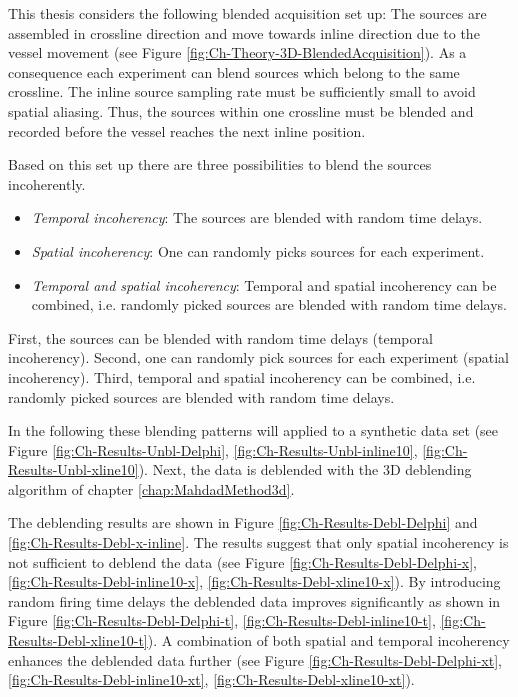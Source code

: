 This thesis considers the following blended acquisition set up: The sources are assembled in crossline direction and move towards inline direction due to the vessel movement (see Figure \ref{fig:Ch-Theory-3D-BlendedAcquisition}). As a consequence each experiment can blend sources which belong to the same crossline. The inline source sampling rate must be sufficiently small to avoid spatial aliasing. Thus, the sources within one crossline must be blended and recorded before the vessel reaches the next inline position.

Based on this set up there are three possibilities to blend the sources incoherently. 

\begin{itemize}
	\item \textit{Temporal incoherency}: The sources are blended with random time delays.
	\item \textit{Spatial incoherency}: One can randomly picks sources for each experiment.
	\item \textit{Temporal and spatial incoherency}: Temporal and spatial incoherency can be combined, i.e. randomly picked sources are blended with random time delays.
\end{itemize}

First, the sources can be blended with random time delays (temporal incoherency). Second, one can randomly pick sources for each experiment (spatial incoherency). Third, temporal and spatial incoherency can be combined, i.e. randomly picked sources are blended with random time delays.

In the following these blending patterns will applied to a synthetic data set (see Figure \ref{fig:Ch-Results-Unbl-Delphi}, \ref{fig:Ch-Results-Unbl-inline10}, \ref{fig:Ch-Results-Unbl-xline10}). Next, the data is deblended with the 3D deblending algorithm of chapter \ref{chap:MahdadMethod3d}. 

The deblending results are shown in Figure \ref{fig:Ch-Results-Debl-Delphi} and \ref{fig:Ch-Results-Debl-x-inline}. The results suggest that only spatial incoherency is not sufficient to deblend the data (see Figure \ref{fig:Ch-Results-Debl-Delphi-x}, \ref{fig:Ch-Results-Debl-inline10-x}, \ref{fig:Ch-Results-Debl-xline10-x}). By introducing random firing time delays the deblended data improves significantly as shown in Figure \ref{fig:Ch-Results-Debl-Delphi-t}, \ref{fig:Ch-Results-Debl-inline10-t}, \ref{fig:Ch-Results-Debl-xline10-t}). A combination of both spatial and temporal incoherency enhances the deblended data further (see Figure \ref{fig:Ch-Results-Debl-Delphi-xt}, \ref{fig:Ch-Results-Debl-inline10-xt}, \ref{fig:Ch-Results-Debl-xline10-xt}).

